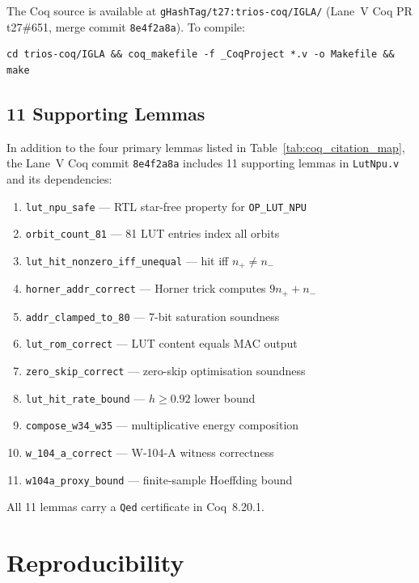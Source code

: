 \noindent The Coq source is available at
\texttt{gHashTag/t27:trios-coq/IGLA/} (Lane~V Coq PR t27\#651,
merge commit \texttt{8e4f2a8a}).  To compile:
\begin{verbatim}
cd trios-coq/IGLA && coq_makefile -f _CoqProject *.v -o Makefile && make
\end{verbatim}

\subsection{11 Supporting Lemmas}

In addition to the four primary lemmas listed in
Table~\ref{tab:coq_citation_map}, the Lane~V Coq commit \texttt{8e4f2a8a}
includes 11 supporting lemmas in \texttt{LutNpu.v} and its dependencies:

\begin{enumerate}
  \item \texttt{lut\_npu\_safe} — RTL star-free property for \texttt{OP\_LUT\_NPU}
  \item \texttt{orbit\_count\_81} — 81 LUT entries index all orbits
  \item \texttt{lut\_hit\_nonzero\_iff\_unequal} — hit iff $n_{+} \neq n_{-}$
  \item \texttt{horner\_addr\_correct} — Horner trick computes $9n_{+} + n_{-}$
  \item \texttt{addr\_clamped\_to\_80} — 7-bit saturation soundness
  \item \texttt{lut\_rom\_correct} — LUT content equals MAC output
  \item \texttt{zero\_skip\_correct} — zero-skip optimisation soundness
  \item \texttt{lut\_hit\_rate\_bound} — $h \geq 0.92$ lower bound
  \item \texttt{compose\_w34\_w35} — multiplicative energy composition
  \item \texttt{w\_104\_a\_correct} — W-104-A witness correctness
  \item \texttt{w104a\_proxy\_bound} — finite-sample Hoeffding bound
\end{enumerate}

All 11 lemmas carry a \texttt{Qed} certificate in Coq~8.20.1.

\section{Reproducibility}
\label{sec:reproducibility}

